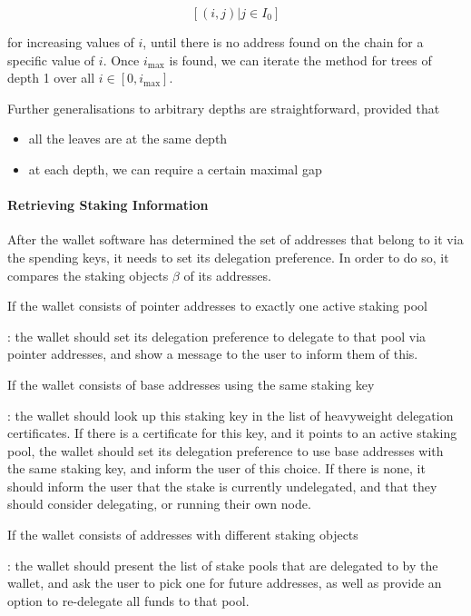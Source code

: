 \documentclass[11pt,a4paper]{article}
\begin{document}
\[
[(i, j) | j \in I_0]
\]

for increasing values of \(i\), until there is no address found on the
chain for a specific value of \(i\). Once \(i_\text{max}\) is found, we
can iterate the method for trees of depth 1 over all
\(i \in [0, i_\text{max}]\).

Further generalisations to arbitrary depths are straightforward,
provided that

\begin{itemize}
\item
  all the leaves are at the same depth
\item
  at each depth, we can require a certain maximal gap
\end{itemize}

\paragraph{Retrieving Staking
Information}\label{retrieving-staking-information}

After the wallet software has determined the set of addresses that
belong to it via the spending keys, it needs to set its delegation
preference. In order to do so, it compares the staking objects \(\beta\)
of its addresses.

If the wallet consists of pointer addresses to exactly one active
staking pool

: the wallet should set its delegation preference to delegate to that
pool via pointer addresses, and show a message to the user to inform
them of this.

If the wallet consists of base addresses using the same staking key

: the wallet should look up this staking key in the list of heavyweight
delegation certificates. If there is a certificate for this key, and it
points to an active staking pool, the wallet should set its delegation
preference to use base addresses with the same staking key, and inform
the user of this choice. If there is none, it should inform the user
that the stake is currently undelegated, and that they should consider
delegating, or running their own node.

If the wallet consists of addresses with different staking objects

: the wallet should present the list of stake pools that are delegated
to by the wallet, and ask the user to pick one for future addresses, as
well as provide an option to re-delegate all funds to that pool.
\end{document}
